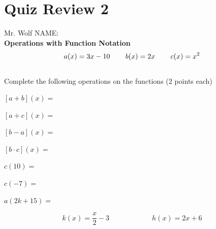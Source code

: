\documentclass[12pt]{article}
\let\stdsection\section
\renewcommand\section{\newpage\stdsection}
\begin{document}
\section*{Quiz Review 2}

Mr. Wolf \hfill NAME:\underline{\hspace{3in}}\\ 


\textbf{Operations with Function Notation}\\

$$a(x)=3x-10 \hspace{.3in} b(x)=2x \hspace{.3in} c(x)=x^2$$\\

Complete the following operations on the functions (2 points each)\\

\begin{enumerate}
\begin{multicols}{2}
	\setlength\itemsep{1cm}

	\item $[a+b](x)=$\\
	
	\item $[a+c](x)=$\\
	
	\item $[b-a](x)=$\\
	
	\item $[b \cdot c](x)=$\\
	
	\item $c(10)=$\\
	
	\item $c(-7)=$\\
	
	\item $a(2k+15)=$\\

\end{multicols}
\end{enumerate}

\hrulefill

$$k(x)=\frac{x}{2}-3 \hspace{1in} h(x)=2x+6$$
\end{document}
